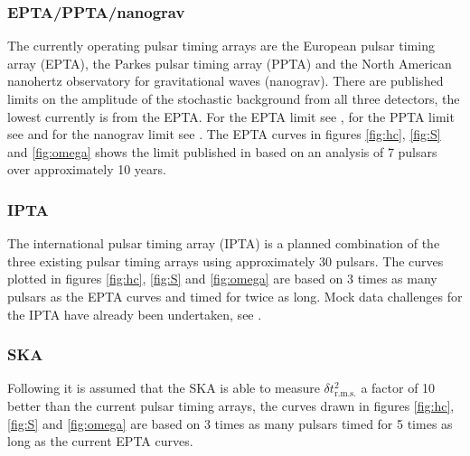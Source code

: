 \subsubsection{EPTA/PPTA/nanograv}
The currently operating pulsar timing arrays are the European pulsar timing array (EPTA), the Parkes pulsar timing array (PPTA) and the North American nanohertz observatory for gravitational waves (nanograv). There are published limits on the amplitude of the stochastic background from all three detectors, the lowest currently is from the EPTA. For the EPTA limit see \cite{Haasteren}, for the PPTA limit see \cite{PPTA} and for the nanograv limit see \cite{NANOgrav}. The EPTA curves in figures \ref{fig:hc}, \ref{fig:S} and \ref{fig:omega} shows the limit published in \cite{Haasteren} based on an analysis of 7 pulsars over approximately 10 years.

\subsubsection{IPTA}
The international pulsar timing array (IPTA) is a planned combination of the three existing pulsar timing arrays using approximately 30 pulsars. The curves plotted in figures \ref{fig:hc}, \ref{fig:S} and \ref{fig:omega} are based on 3 times as many pulsars as the EPTA curves and timed for twice as long. Mock data challenges for the IPTA have already been undertaken, see \cite{2013arXiv1301.6673V}.

\subsubsection{SKA}
Following \cite{SesanaVecchioColancino} it is assumed that the SKA is able to measure $\delta t^{2}_{\textrm{r.m.s.}}$ a factor of 10 better than the current pulsar timing arrays, the curves drawn in figures \ref{fig:hc}, \ref{fig:S} and \ref{fig:omega} are based on 3 times as many pulsars timed for 5 times as long as the current EPTA curves.





